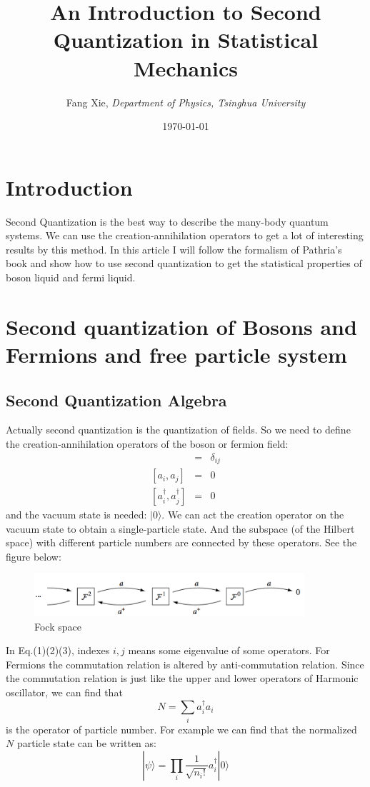 \documentclass{article}
\author{Fang Xie, \emph{Department of Physics, Tsinghua University}}
\title{{\bf{An Introduction to Second Quantization in Statistical Mechanics}}}
\date{\today}
\begin{document}
\maketitle
\section{Introduction}
Second Quantization is the best way to describe the many-body quantum systems. We can use the creation-annihilation operators to get a lot of interesting results by this method. In this article I will follow the formalism of Pathria's book and show how to use second quantization to get the statistical properties of boson liquid and fermi liquid.

\section{Second quantization of Bosons and Fermions and free particle system}
\subsection{Second Quantization Algebra}
Actually second quantization is the quantization of fields. So we need to define the creation-annihilation operators of the boson or fermion field:
\begin{eqnarray}
[a_i,a^\dagger_j] &=& \delta_{ij}\\
\left[a_i,a_j\right] &=& 0 \\
\left[a^\dagger_i,a^\dagger_j\right] &=& 0 
\end{eqnarray}
and the vacuum state is needed: $|0\rangle$. We can act the creation operator on the vacuum state to obtain a single-particle state. And the subspace (of the Hilbert space) with different particle numbers are connected by these operators. See the figure below:
\begin{figure}[!htp]
\centering
\includegraphics[width=10cm]{./figure/pic1.png}
\caption{Fock space}
\end{figure}

In Eq.(1)(2)(3), indexes $i,j$ means some eigenvalue of some operators. For Fermions the commutation relation is altered by anti-commutation relation. Since the commutation relation is just like the upper and lower operators of Harmonic oscillator, we can find that
$$
N = \sum_i a^\dagger_i a_i 
$$
is the operator of particle number. For example we can find that the normalized $N$ particle state can be written as:
$$
|\psi\rangle = \prod_{i}\frac{1}{\sqrt{n_i !}}a^\dagger_i |0\rangle
$$
\end{document}
